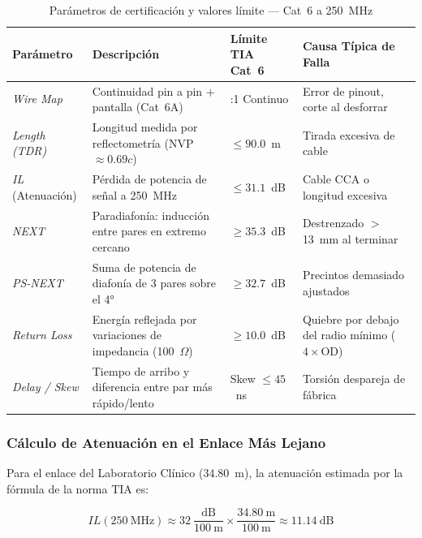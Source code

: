 \begin{table}[H]
\centering
\caption{Parámetros de certificación y valores límite --- Cat~6 a 250~MHz}
\small
\begin{tabularx}{\textwidth}{@{}p{2.2cm}X>{\centering\arraybackslash}p{2.2cm}>{\raggedright\arraybackslash}p{4.0cm}@{}}
\toprule
\textbf{Parámetro} & \textbf{Descripción} & \textbf{Límite TIA Cat~6} & \textbf{Causa Típica de Falla} \\
\midrule
\textit{Wire Map}       & Continuidad pin a pin + pantalla (Cat~6A)              & 1:1 Continuo  & Error de pinout, corte al desforrar \\
\textit{Length (TDR)}   & Longitud medida por reflectometría (NVP $\approx 0.69c$)& $\leq 90.0$~m & Tirada excesiva de cable \\
\textit{IL} (Atenuación)& Pérdida de potencia de señal a 250~MHz                  & $\leq 31.1$~dB & Cable CCA o longitud excesiva \\
\textit{NEXT}           & Paradiafonía: inducción entre pares en extremo cercano  & $\geq 35.3$~dB & Destrenzado $>$ 13~mm al terminar \\
\textit{PS-NEXT}        & Suma de potencia de diafonía de 3 pares sobre el 4°     & $\geq 32.7$~dB & Precintos demasiado ajustados \\
\textit{Return Loss}    & Energía reflejada por variaciones de impedancia (100~$\Omega$) & $\geq 10.0$~dB & Quiebre por debajo del radio mínimo ($4\times$OD) \\
\textit{Delay / Skew}   & Tiempo de arribo y diferencia entre par más rápido/lento & Skew $\leq 45$~ns & Torsión despareja de fábrica \\
\bottomrule
\end{tabularx}
\label{tab:certificacion}
\end{table}

\subsubsection{Cálculo de Atenuación en el Enlace Más Lejano}

Para el enlace del Laboratorio Clínico (34.80~m), la atenuación estimada por la fórmula de la norma TIA es:

\begin{equation}
IL(250~\text{MHz}) \approx 32~\frac{\text{dB}}{100~\text{m}} \times \frac{34.80~\text{m}}{100~\text{m}} \approx 11.14~\text{dB}
\end{equation}

